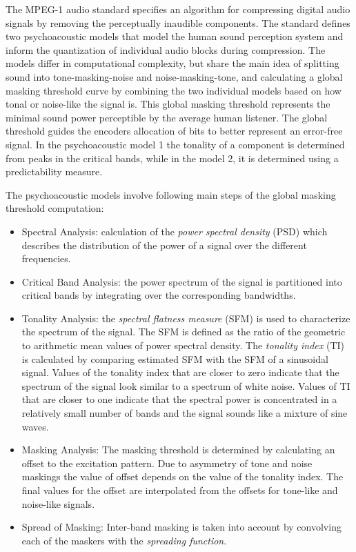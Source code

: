 The MPEG-1 audio standard specifies an algorithm for compressing digital audio signals by removing the perceptually inaudible components. The standard defines two psychoacoustic models that model the human sound perception system and inform the quantization of individual audio blocks during compression. The models differ in computational complexity, but share the main idea of splitting sound into tone-masking-noise and noise-masking-tone, and calculating a global masking threshold curve  by combining the two individual models based on how tonal or noise-like the signal is. This global masking threshold represents the minimal sound power perceptible by the average human listener. The global threshold guides the encoders allocation of bits to better represent an error-free signal. In the psychoacoustic model 1 the tonality of a component is determined from peaks in the critical bands, while in the model 2, it is determined using a predictability measure.
 
 The psychoacoustic models involve following main steps of the global masking threshold computation:
 \begin{itemize}
 \item Spectral Analysis: calculation of the \emph{power spectral density} (PSD) which describes the distribution of the power of a signal over the different frequencies.
 \item Critical Band Analysis: the power spectrum of the signal is partitioned into critical bands by integrating over the corresponding bandwidths.
 \item Tonality Analysis: the \emph{spectral flatness measure} (SFM) is used to characterize the spectrum of the signal. The SFM is defined as the ratio of the geometric to arithmetic mean values of power spectral density. The \emph{tonality index} (TI) is calculated by comparing estimated SFM with the SFM of a sinusoidal signal. Values of the tonality index that are closer to zero indicate that the spectrum of the signal look similar to a spectrum of white noise. Values of TI that are closer to one indicate that the spectral power is concentrated in a relatively small number of bands and the signal sounds like a mixture of sine waves.
 \item Masking Analysis: The masking threshold is determined by calculating an offset to the excitation pattern. Due to asymmetry of tone and noise maskings the value of offset depends on the value of the tonality index. The final values for the offset are interpolated from the offsets for tone-like and noise-like signals.
 \item Spread of Masking: Inter-band masking is taken into account by convolving each of the maskers with the \emph{spreading function}.
 \end{itemize}
